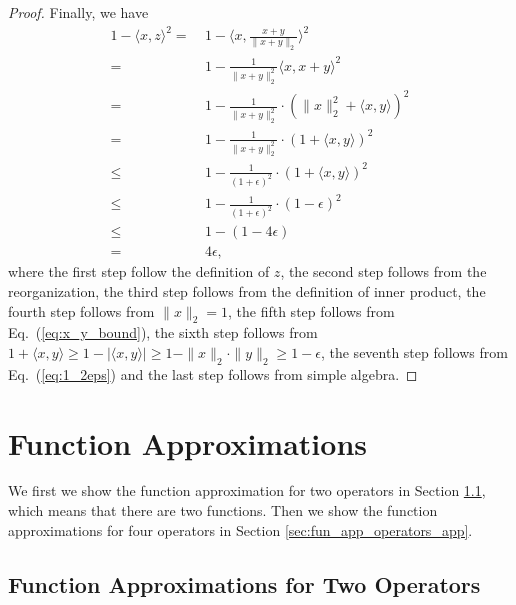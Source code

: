 \begin{proof}
Finally, we have
\begin{align*}
1 - \langle x, z \rangle^2
= & ~ 1 - \langle x, \frac{x+y}{ \| x + y \|_2 } \rangle^2 \\
= & ~ 1 - \frac{1}{\| x + y \|_2^2} \langle x , x+y \rangle^2 \\
= & ~ 1 - \frac{1}{\| x + y \|_2^2} \cdot ( \| x \|_2^2 + \langle x , y \rangle )^2 \\
= & ~  1 - \frac{1}{\| x + y \|_2^2} \cdot ( 1 + \langle x , y \rangle )^2 \\
\leq & ~ 1 - \frac{1}{(1+\epsilon)^2} \cdot ( 1 + \langle x , y \rangle )^2 \\
\leq & ~ 1 - \frac{1}{(1+\epsilon)^2} \cdot ( 1 - \epsilon )^2 \\
\leq & ~ 1 -  (1- 4 \epsilon) \\
= & ~ 4 \epsilon,
\end{align*}
where the first step follow the definition of $z$, the second step follows from the reorganization, the third step follows from the definition of inner product, the fourth step follows from $\| x \|_2 = 1$, the fifth step follows from Eq.~(\ref{eq:x_y_bound}), the sixth step follows from  $1+\langle x,y\rangle \geq 1 - | \langle x , y \rangle | \geq 1 - \| x \|_2 \cdot \| y \|_2 \geq 1- \epsilon$, the seventh step follows from Eq.~(\ref{eq:1_2eps}) and the last step follows from simple algebra.


\end{proof}

\section{Function Approximations}\label{sec:function_approx}

We first we show the function approximation for two operators in Section \ref{sec:fun_app_app}, which means that there are two functions. Then we show the function approximations for four operators in Section \ref{sec:fun_app_operators_app}.


\subsection{Function Approximations for Two Operators}\label{sec:fun_app_app}

